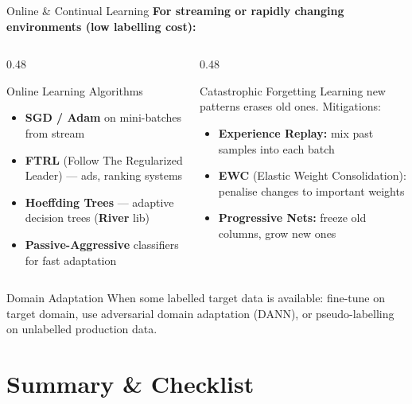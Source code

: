\documentclass[10pt,aspectratio=169]{beamer}
\begin{document}
\begin{frame}{Online \& Continual Learning}
  \textbf{For streaming or rapidly changing environments (low labelling cost):}
  \vspace{0.2cm}
  \begin{columns}[T]
    \begin{column}{0.48\textwidth}
      \begin{block}{Online Learning Algorithms}
        \begin{itemize}
          \item \textbf{SGD / Adam} on mini-batches from stream
          \item \textbf{FTRL} (Follow The Regularized Leader) --- ads, ranking systems
          \item \textbf{Hoeffding Trees} --- adaptive decision trees (\textbf{River} lib)
          \item \textbf{Passive-Aggressive} classifiers for fast adaptation
        \end{itemize}
      \end{block}
    \end{column}
    \begin{column}{0.48\textwidth}
      \begin{alertblock}{Catastrophic Forgetting}
        Learning new patterns erases old ones. Mitigations:
        \begin{itemize}
          \item \textbf{Experience Replay:} mix past samples into each batch
          \item \textbf{EWC} (Elastic Weight Consolidation): penalise changes to important weights
          \item \textbf{Progressive Nets:} freeze old columns, grow new ones
        \end{itemize}
      \end{alertblock}
    \end{column}
  \end{columns}
  \vspace{0.2cm}
  \begin{exampleblock}{Domain Adaptation}
    When some labelled target data is available: fine-tune on target domain, use adversarial domain adaptation (DANN), or pseudo-labelling on unlabelled production data.
  \end{exampleblock}
\end{frame}

\section{Summary \& Checklist}
\end{document}

